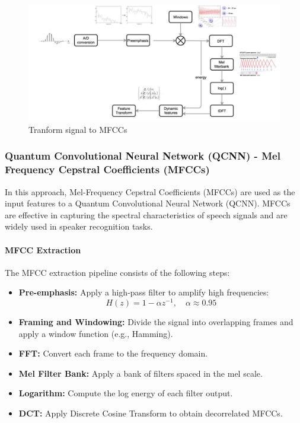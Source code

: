 \documentclass[conference]{IEEEtran}
\begin{document}
\begin{figure}[H]
    \centering
    \begin{minipage}{0.45\textwidth}
        \centering
        \includegraphics[width=1\textwidth]{resource/img/mfcc_flow.pdf}
        \caption{Tranform signal to MFCCs}
        \label{fig:LSTM}
    \end{minipage}
\end{figure}

\subsubsection{Quantum Convolutional Neural Network (QCNN) - Mel Frequency Cepstral Coefficients (MFCCs)}

In this approach, Mel-Frequency Cepstral Coefficients (MFCCs) are used as the input features to a Quantum Convolutional Neural Network (QCNN). MFCCs are effective in capturing the spectral characteristics of speech signals and are widely used in speaker recognition tasks.

\paragraph{MFCC Extraction}

The MFCC extraction pipeline consists of the following steps:

\begin{itemize}
    \item \textbf{Pre-emphasis:} Apply a high-pass filter to amplify high frequencies:
    \[
    H(z) = 1 - \alpha z^{-1}, \quad \alpha \approx 0.95
    \]
    \item \textbf{Framing and Windowing:} Divide the signal into overlapping frames and apply a window function (e.g., Hamming).
    \item \textbf{FFT:} Convert each frame to the frequency domain.
    \item \textbf{Mel Filter Bank:} Apply a bank of filters spaced in the mel scale.
    \item \textbf{Logarithm:} Compute the log energy of each filter output.
    \item \textbf{DCT:} Apply Discrete Cosine Transform to obtain decorrelated MFCCs.
\end{itemize}
\end{document}
